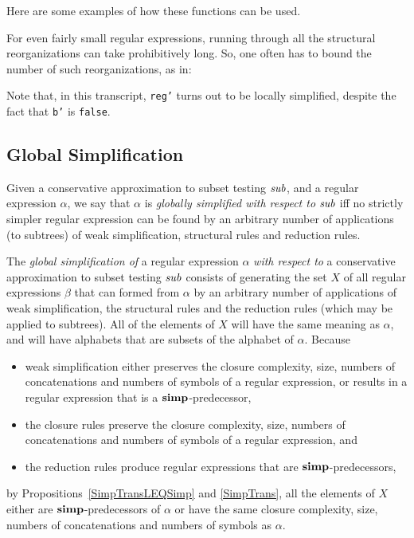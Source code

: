 Here are some examples of how these functions can be used.

For even fairly small regular expressions, running through all the
structural reorganizations can take prohibitively long.  So, one
often has to bound the number of such reorganizations, as in:

Note that, in this transcript, \texttt{reg'} turns out to be
locally simplified, despite the fact that \texttt{b'} is \texttt{false}.
%
%

\subsection*{Global Simplification}

%
%

Given a conservative approximation to subset testing ${\it sub}$, and a
%
regular expression $\alpha$, we say that $\alpha$ is \emph{globally
  simplified with respect to} ${\it sub}$ iff no strictly simpler regular
expression can be found by an arbitrary number of applications (to
subtrees) of weak simplification, structural rules and reduction
rules.

The \emph{global simplification of} a regular expression $\alpha$
\emph{with respect to} a conservative approximation to subset testing
${\it sub}$ consists of generating the set $X$ of all regular expressions
$\beta$ that can formed from $\alpha$ by an arbitrary number of
applications of weak simplification, the structural rules and the
reduction rules (which may be applied to subtrees). All of the
elements of $X$ will have the same meaning as $\alpha$, and will have
alphabets that are subsets of the alphabet of $\alpha$. Because
\begin{itemize}
\item weak simplification either preserves the closure complexity,
  size, numbers of concatenations and numbers of symbols of a regular
  expression, or results in a regular expression that is a
  $\mathrel{\mathbf{simp}}$-predecessor,

\item the closure rules preserve the closure complexity,
  size, numbers of concatenations and numbers of symbols of a regular
  expression, and

\item the reduction rules produce regular expressions that are
  $\mathrel{\mathbf{simp}}$-predecessors,
\end{itemize}
by Propositions~\ref{SimpTransLEQSimp} and \ref{SimpTrans}, all the
elements of $X$ either are ${\mathrel{\mathbf{simp}}}$-predecessors of $\alpha$ or have
the same closure complexity, size, numbers of concatenations and
numbers of symbols as $\alpha$.

